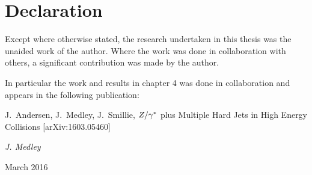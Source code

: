 \chapter*{Declaration}

\normalsize
Except where otherwise stated, the research undertaken in this thesis
was the unaided work of the author. Where the work was done in collaboration
with others, a significant contribution was made by the author.

In particular the work and results in chapter 4 was done in collaboration
and appears in the following publication:

\cite{ZPaper} J.~Andersen, J.~Medley, J.~Smillie, $Z/\gamma^*$ plus Multiple Hard Jets
in High Energy Collisions [arXiv:1603.05460]

\vspace{20mm}
\hfill {\it J. Medley}

\hfill March 2016


